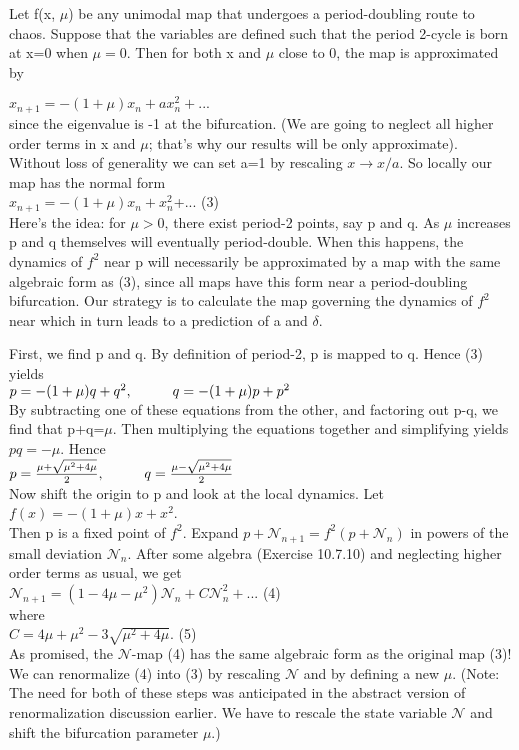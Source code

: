\documentclass{article}
\newcommand\tab[1][1cm]{\hspace*{#1}}
\begin{document}
Let f(x, $\mu$) be any unimodal map that undergoes a period-doubling route to chaos. Suppose that the variables are defined such that the period 2-cycle is born at x=0 when $\mu=0$. Then for both x and $\mu$ close to 0, the map is approximated by \\ \tab \tab

$x_{n+1}=-(1+\mu)x_{n}+ax^{2}_{n}+...$ \\

since the eigenvalue is -1 at the bifurcation. (We are going to neglect all higher order terms in x and $\mu$; that's why our results will be only approximate). Without loss of generality we can set a=1 by rescaling $x \to x/a$. So locally our map has the normal form \\ \tab \tab
$x_{n+1}=-(1+\mu)x_{n}+x^{2}_{n}$+... \tab (3) \\ \tab
Here's the idea: for $\mu > 0$, there exist period-2 points, say p and q. As $\mu$ increases p and q themselves will eventually period-double. When this happens, the dynamics of $f^{2}$ near p will necessarily be approximated by a map with the same algebraic form as (3), since all maps have this form near a period-doubling bifurcation. Our strategy is to calculate the map governing the dynamics of $f^{2}$ near which in turn leads to a prediction of a and $\delta$. \\ \tab

First, we find p and q. By definition of period-2, p is mapped to q. Hence (3) yields \\ \tab \tab
$p=-(1+\mu)q + q^{2},  \tab q=-(1+\mu)p+p^{2}$ \\
By subtracting one of these equations from the other, and factoring out p-q, we find that p+q=$\mu$. Then multiplying the equations together and simplifying yields $pq=-\mu$. Hence \\ \tab \tab
$p=\frac{\mu + \sqrt{\mu^{2}+4\mu}}{2}, \tab q=\frac{\mu - \sqrt{\mu^{2}+4\mu}}{2}$ \\ 

Now shift the origin to p and look at the local dynamics. Let \\ \tab \tab
$f(x)=-(1+\mu)x+x^{2}$. \\
Then p is a fixed point of $f^{2}$. Expand $p+\mathscr{N}_{n+1}=f^{2}(p+\mathscr{N}_{n})$ in powers of the small deviation $\mathscr{N}_{n}$. After some algebra (Exercise 10.7.10) and neglecting higher order terms as usual, we get \\ \tab \tab
$\mathscr{N}_{n+1}=(1-4\mu-\mu^{2})\mathscr{N}_{n}+C\mathscr{N}^{2}_{n}+...$ \tab (4) \\ 
where \\ \tab \tab 
$C=4\mu+\mu^{2}-3\sqrt{\mu^{2}+4\mu}$. \tab (5) \\ \tab
As promised, the $\mathscr{N}$-map (4) has the same algebraic form as the original map (3)! We can renormalize (4) into (3) by rescaling $\mathscr{N}$ and by defining a new $\mu$. (Note: The need for both of these steps was anticipated in the abstract version of renormalization discussion earlier. We have to rescale the state variable $\mathscr{N}$ and shift the bifurcation parameter $\mu$.) \\ \tab 
\end{document}
